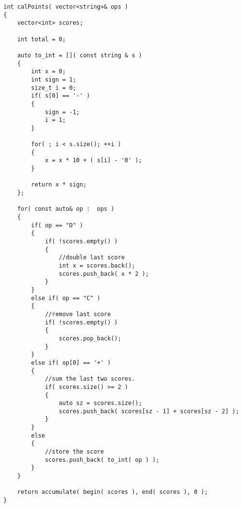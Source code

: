 \setcounter{lstlisting}{0}
\begin{lstlisting}[style=customc, caption={Simulation}]
int calPoints( vector<string>& ops )
{
    vector<int> scores;

    int total = 0;

    auto to_int = []( const string & s )
    {
        int x = 0;
        int sign = 1;
        size_t i = 0;
        if( s[0] == '-' )
        {
            sign = -1;
            i = 1;
        }

        for( ; i < s.size(); ++i )
        {
            x = x * 10 + ( s[i] - '0' );
        }

        return x * sign;
    };

    for( const auto& op :  ops )
    {
        if( op == "D" )
        {
            if( !scores.empty() )
            {
                //double last score
                int x = scores.back();
                scores.push_back( x * 2 );
            }
        }
        else if( op == "C" )
        {
            //remove last score
            if( !scores.empty() )
            {
                scores.pop_back();
            }
        }
        else if( op[0] == '+' )
        {
            //sum the last two scores.
            if( scores.size() >= 2 )
            {
                auto sz = scores.size();
                scores.push_back( scores[sz - 1] + scores[sz - 2] );
            }
        }
        else
        {
            //store the score
            scores.push_back( to_int( op ) );
        }
    }

    return accumulate( begin( scores ), end( scores ), 0 );
}
\end{lstlisting}